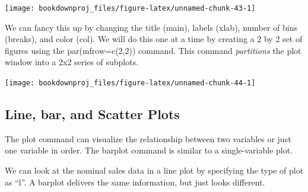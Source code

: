 \documentclass[
]{book}
\newenvironment{Shaded}{\begin{snugshade}}{\end{snugshade}}
\newcommand{\AttributeTok}[1]{\textcolor[rgb]{0.13,0.29,0.53}{#1}}
\newcommand{\DecValTok}[1]{\textcolor[rgb]{0.00,0.00,0.81}{#1}}
\newcommand{\FunctionTok}[1]{\textcolor[rgb]{0.13,0.29,0.53}{\textbf{#1}}}
\newcommand{\NormalTok}[1]{#1}
\newcommand{\SpecialCharTok}[1]{\textcolor[rgb]{0.81,0.36,0.00}{\textbf{#1}}}
\newcommand{\StringTok}[1]{\textcolor[rgb]{0.31,0.60,0.02}{#1}}
\begin{document}
\begin{center}\texttt{[image: bookdownproj\_files/figure-latex/unnamed-chunk-43-1]} \end{center}

We can fancy this up by changing the title (main), labels (xlab), number of bins (breaks), and color (col). We will do this one at a time by creating a 2 by 2 set of figures using the par(mfrow=c(2,2)) command. This command \emph{partitions} the plot window into a 2x2 series of subplots.

\begin{Shaded}
\end{Shaded}

\begin{center}\texttt{[image: bookdownproj\_files/figure-latex/unnamed-chunk-44-1]} \end{center}

\subsection{Line, bar, and Scatter Plots}\label{line-bar-and-scatter-plots}

The plot command can visualize the relationship between two variables or just one variable in order. The barplot command is similar to a single-variable plot.

We can look at the nominal sales data in a line plot by specifying the type of plot as ``l''. A barplot delivers the same information, but just looks different.
\end{document}
